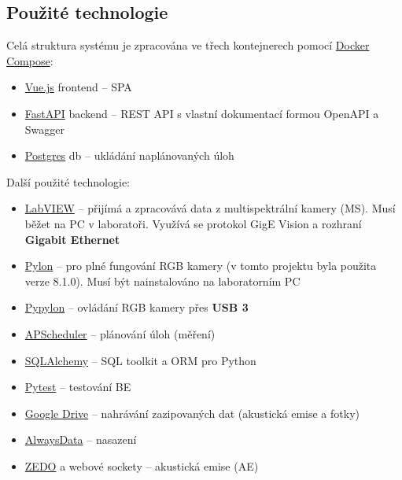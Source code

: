 \documentclass[12pt]{article}
\begin{document}
\begin{teamwork}
        \subsection{Použité technologie}\label{subsec:techstack}

        Celá struktura systému je zpracována ve třech kontejnerech pomocí \href{https://docs.docker.com/compose/}{Docker Compose}:

        \begin{itemize}
            \item \href{https://vuejs.org/}{Vue.js} frontend – SPA
            \item \href{https://fastapi.tiangolo.com/}{FastAPI} backend – REST API s vlastní dokumentací formou OpenAPI a Swagger
            \item \href{https://www.postgresql.org/}{Postgres} db – ukládání naplánovaných úloh
        \end{itemize}

        Další použité technologie:

        \begin{itemize}
            \item \href{https://www.ni.com/en/shop/labview.html}{LabVIEW} – přijímá a zpracovává data z multispektrální kamery (MS). Musí běžet na PC v laboratoři.
            Využívá se protokol GigE Vision a rozhraní \textbf{Gigabit Ethernet}
            \item \href{https://www.baslerweb.com/en/downloads/software/?downloadCategory.values.label.data=pylon}{Pylon} – pro plné fungování RGB kamery (v tomto projektu byla použita verze 8.1.0).
            Musí být nainstalováno na laboratorním PC
            \item \href{https://github.com/basler/pypylon}{Pypylon} – ovládání RGB kamery přes \textbf{USB 3}
            \item \href{https://github.com/agronholm/apscheduler}{APScheduler} – plánování úloh (měření)
            \item \href{https://www.sqlalchemy.org/}{SQLAlchemy} – SQL toolkit a ORM pro Python
            \item \href{https://docs.pytest.org/en/stable/}{Pytest} – testování BE
            \item \href{https://workspace.google.com/products/drive/}{Google Drive} – nahrávání zazipovaných dat (akustická emise a fotky)
            \item \href{https://www.alwaysdata.com/en/}{AlwaysData} – nasazení
            \item \href{http://dakel.cz/index.php?pg=prod/dev/zedo_en}{ZEDO} a webové sockety – akustická emise (AE)
        \end{itemize}


\end{teamwork}
\end{document}
